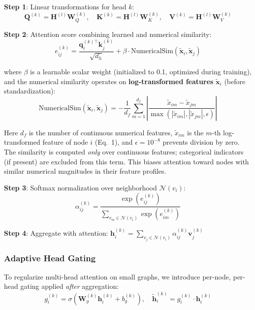 \textbf{Step 1}: Linear transformations for head $k$:
\begin{equation}
\mathbf{Q}^{(k)} = \mathbf{H}^{(l)} \mathbf{W}_Q^{(k)}, \quad \mathbf{K}^{(k)} = \mathbf{H}^{(l)} \mathbf{W}_K^{(k)}, \quad \mathbf{V}^{(k)} = \mathbf{H}^{(l)} \mathbf{W}_V^{(k)}
\end{equation}

\textbf{Step 2}: Attention score combining learned and numerical similarity:
\begin{equation}
e_{ij}^{(k)} = \frac{\mathbf{q}_i^{(k) \top} \mathbf{k}_j^{(k)}}{\sqrt{d_h}} + \beta \cdot \text{NumericalSim}(\tilde{\mathbf{x}}_i, \tilde{\mathbf{x}}_j)
\end{equation}

where $\beta$ is a learnable scalar weight (initialized to 0.1, optimized during training), and the numerical similarity operates on \textbf{log-transformed features} $\tilde{\mathbf{x}}_i$ (before standardization):
\begin{equation}
\text{NumericalSim}(\tilde{\mathbf{x}}_i, \tilde{\mathbf{x}}_j) = -\frac{1}{d_f} \sum_{m=1}^{d_f} \left| \frac{\tilde{x}_{im} - \tilde{x}_{jm}}{\max(|\tilde{x}_{im}|, |\tilde{x}_{jm}|, \epsilon)} \right|
\end{equation}

Here $d_f$ is the number of continuous numerical features, $\tilde{x}_{im}$ is the $m$-th log-transformed feature of node $i$ (Eq.~1), and $\epsilon = 10^{-8}$ prevents division by zero. The similarity is computed \textit{only} over continuous features; categorical indicators (if present) are excluded from this term. This biases attention toward nodes with similar numerical magnitudes in their feature profiles.

\textbf{Step 3}: Softmax normalization over neighborhood $\mathcal{N}(v_i)$:
\begin{equation}
\alpha_{ij}^{(k)} = \frac{\exp(e_{ij}^{(k)})}{\sum_{v_m \in \mathcal{N}(v_i)} \exp(e_{im}^{(k)})}
\end{equation}

\textbf{Step 4}: Aggregate with attention: $\mathbf{h}_i^{(k)} = \sum_{v_j \in \mathcal{N}(v_i)} \alpha_{ij}^{(k)} \mathbf{v}_j^{(k)}$

\subsubsection{Adaptive Head Gating}

To regularize multi-head attention on small graphs, we introduce per-node, per-head gating applied \textit{after} aggregation:
\begin{equation}
g_i^{(k)} = \sigma\left( \mathbf{W}_g^{(k)} \mathbf{h}_i^{(k)} + b_g^{(k)} \right), \quad \tilde{\mathbf{h}}_i^{(k)} = g_i^{(k)} \cdot \mathbf{h}_i^{(k)}
\end{equation}

